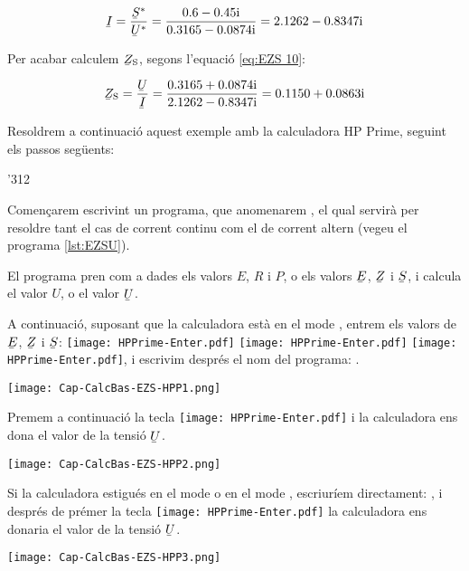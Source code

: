 \begin{exemple}
    \[
       \cmplx{I} = \frac{\cmplx{S}^*}{\cmplx{U}^*} = \frac{\complexnum{0,6-j 0,45}}{\complexnum{0,3165 - j 0,0874}}
       = \complexnum{2,1262 - j 0,8347}
    \]

    Per acabar calculem $\cmplx{Z}\ped{S}$, segons l'equació
    \eqref{eq:EZS 10}:

    \[
        \cmplx{Z}\ped{S} = \frac{\cmplx{U}}{\cmplx{I}} = \frac{\complexnum{0,3165 + j 0,0874}}
        {\complexnum{2,1262 - j 0,8347}} = \complexnum{0,1150 + j 0,0863}
    \]

    Resoldrem a continuació aquest exemple amb la calculadora \textsf{HP Prime}, seguint els passos següents:
    \begin{dingautolist}{'312}
        \item Començarem escrivint un programa, que anomenarem  , el qual servirà per resoldre tant el cas de corrent continu com el de corrent altern (vegeu el programa \vref{lst:EZSU}).

        El programa pren com a dades els valors  $E$, $R$ i $P$, o els valors  $\cmplx{E}$, $\cmplx{Z}$ i $\cmplx{S}$, i calcula el valor  $U$, o el valor $\cmplx{U}$.


    \item A continuació, suposant  que la calculadora està en el mode , entrem els valors de $\cmplx{E}$, $\cmplx{Z}$ i $\cmplx{S}$:  \texttt{[image: HPPrime-Enter.pdf]}  \texttt{[image: HPPrime-Enter.pdf]}  \texttt{[image: HPPrime-Enter.pdf]}, i  escrivim després el nom del programa: .

        \texttt{[image: Cap-CalcBas-EZS-HPP1.png]}

    \item Premem a continuació la tecla \texttt{[image: HPPrime-Enter.pdf]} i la calculadora ens dona el valor de la tensió $\cmplx{U}$.

        \texttt{[image: Cap-CalcBas-EZS-HPP2.png]}


     \item   Si la calculadora estigués en el mode  o en el mode  , escriuríem directament: , i després de prémer la tecla \texttt{[image: HPPrime-Enter.pdf]} la calculadora ens donaria el valor de la tensió $\cmplx{U}$.

        \texttt{[image: Cap-CalcBas-EZS-HPP3.png]}

    \end{dingautolist}
\end{exemple}



